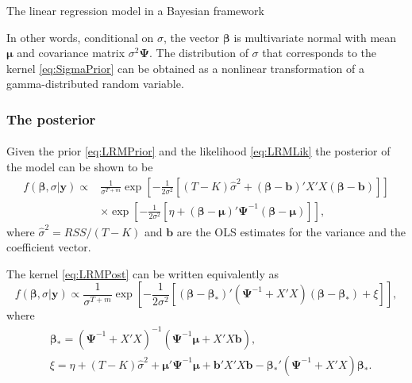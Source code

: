 \documentclass[10pt]{beamer}
\theoremstyle{definition}
\begin{document}
\begin{section}{The linear regression model in a Bayesian framework}
\begin{frame}[fragile]
In other words, conditional on $\sigma$, the vector $\boldsymbol{\beta}$ is multivariate normal with mean  $\boldsymbol{\mu}$ and covariance matrix $\sigma^2\boldsymbol{\Psi}$. The distribution of $\sigma$ that corresponds to the kernel \eqref{eq:SigmaPrior} can be obtained as a nonlinear transformation of a gamma-distributed random variable.
\end{frame}

\begin{frame}[fragile]
\frametitle{The posterior}
\framesubtitle{}
Given the prior \eqref{eq:LRMPrior} and the likelihood \eqref{eq:LRMLik} the posterior of the model can be shown to be \begin{equation}
\label{eq:LRMPost}\begin{split}f(\boldsymbol{\beta},\sigma|\mathbf{y})\propto
& \frac{1}{\sigma^{T+m}}\exp\left[
-\frac{1}{2\sigma^2}\left[(T-K)\hat{\sigma}^2+(\boldsymbol{\beta}-\mathbf{b})'X'X(\boldsymbol{\beta}-\mathbf{b})\right]
\right]\\& \times \exp \left[
-\frac{1}{2\sigma^2}\left[\eta+(\boldsymbol{\beta}-\boldsymbol{\mu})'\boldsymbol{\Psi}^{-1}(\boldsymbol{\beta}-\boldsymbol{\mu})\right]
\right], \end{split}
\end{equation}
where $\hat{\sigma}^2=RSS/(T-K)$ and
$\mathbf{b}$ are the OLS estimates for the variance and the coefficient vector.

The kernel \eqref{eq:LRMPost} can be written equivalently as
\begin{equation}
\label{eq:LRMPost1}f(\boldsymbol{\beta},\sigma|\mathbf{y})\propto\frac{1}{\sigma^{T+m}}\exp \left[ -\frac{1}{2\sigma^2}[(\boldsymbol{\beta}-\boldsymbol{\beta_*})' (\boldsymbol{\Psi}^{-1}+X'X)(\boldsymbol{\beta}-\boldsymbol{\beta_*})+\xi]\right],
\end{equation}
where \begin{align*}
&\boldsymbol{\beta_*} = (\boldsymbol{\Psi}^{-1}+X'X)^{-1}(\boldsymbol{\Psi}^{-1} \boldsymbol{\mu}+X'X\mathbf{b}),\\
&\xi = \eta+(T-K)\hat{\sigma}^2+\boldsymbol{\mu}'\boldsymbol{\Psi}^{-1} \boldsymbol{\mu}+\mathbf{b}'X'X\mathbf{b}-\boldsymbol{\beta_*}'(\boldsymbol{\Psi}^{-1}+X'X)\boldsymbol{\beta_*}.
\end{align*}
\end{frame}


\end{section}
\end{document}
